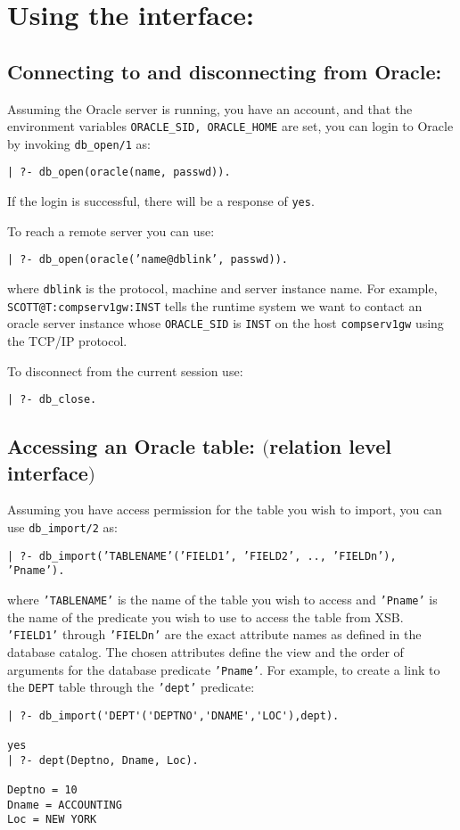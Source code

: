 \section{Using the interface:} \label{oracle:use}


\subsection{Connecting to and disconnecting from Oracle:}

Assuming the Oracle server is running, you have an account, and that
the environment variables {\tt ORACLE\_SID, ORACLE\_HOME} are set, you
can login to Oracle by invoking {\tt db\_open/1} as:
\begin{center}
{\tt  | ?- db\_open(oracle(name, passwd)).}
\end{center}
If the login is successful, there will be a response of {\tt yes}.

To reach a remote server you can use:
\begin{center}
{\tt  | ?- db\_open(oracle('name@dblink', passwd)).}
\end{center}
where {\tt dblink} is the protocol, machine and server instance name.
For example, \\ {\tt SCOTT@T:compserv1gw:INST} tells the runtime system we
want to contact an oracle server instance whose {\tt ORACLE\_SID} is
{\tt INST} on the host {\tt compserv1gw} using the TCP/IP protocol.

To disconnect from the current session use:
\begin{center}
{\tt  | ?- db\_close.}
\end{center}


\subsection{Accessing an Oracle table: $($relation level interface$)$}
\label{sec:oracle:rellevel}

Assuming you have access permission for the table you wish to import,
you can use {\tt db\_import/2} as:
\begin{center}
{\tt | ?- db\_import('TABLENAME'('FIELD1', 'FIELD2', .., 'FIELDn'), 'Pname').}
\end{center}
where {\tt 'TABLENAME'} is the name of the table you wish to access
and {\tt 'Pname'} is the name of the predicate you wish to use to
access the table from XSB. {\tt 'FIELD1'} through {\tt 'FIELDn'} are
the exact attribute names as defined in the database catalog.  The
chosen attributes define the view and the order of arguments for the
database predicate {\tt 'Pname'}.  For example, to create a link to
the {\tt DEPT} table through the {\tt 'dept'} predicate:
\begin{verbatim}
| ?- db_import('DEPT'('DEPTNO','DNAME','LOC'),dept).

yes
| ?- dept(Deptno, Dname, Loc).

Deptno = 10
Dname = ACCOUNTING
Loc = NEW YORK 
\end{verbatim}

